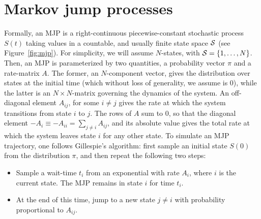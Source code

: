 \section{Markov jump processes}
Formally, an MJP is a right-continuous piecewise-constant stochastic
process $S(t)$ taking values in a countable, and usually finite state
space ${\mathcal S}$ (see Figure~\ref{fig:mjp}). For simplicity, we will assume 
$N$-states, with ${\mathcal S} = \{1,\ldots,N\}$. Then, an MJP is 
parameterized by two quantities, a probability vector $\pi$ and a 
rate-matrix $A$. The former, an $N$-component vector, gives the 
distribution over states at the initial time (which without loss of 
generality, we assume is $0$), while the latter is an 
$N \times N$-matrix governing the dynamics of the system.  An 
off-diagonal element $A_{ij}$, for some $i \neq j$ gives the rate at 
which the system transitions from state $i$ to $j$. The rows of $A$ 
sum to $0$, so that the diagonal element $-A_i \equiv -A_{ii} = \sum_{j \neq i} A_{ij}$, 
and its absolute value gives
the total rate at which the system leaves state $i$ for any other state.
To simulate an MJP trajectory, one follows Gillespie's algorithm: 
first sample an initial state $S(0)$ from the distribution $\pi$, and
then repeat the following two steps:
\begin{itemize}
  \item Sample a wait-time $t_i$ from an exponential with rate $A_i$, where
    $i$ is the current state. The MJP remains in state $i$ for time $t_i$.
  \item At the end of this time, jump to a new state $j \neq i$ with 
    probability proportional to $A_{ij}$.
\end{itemize}


